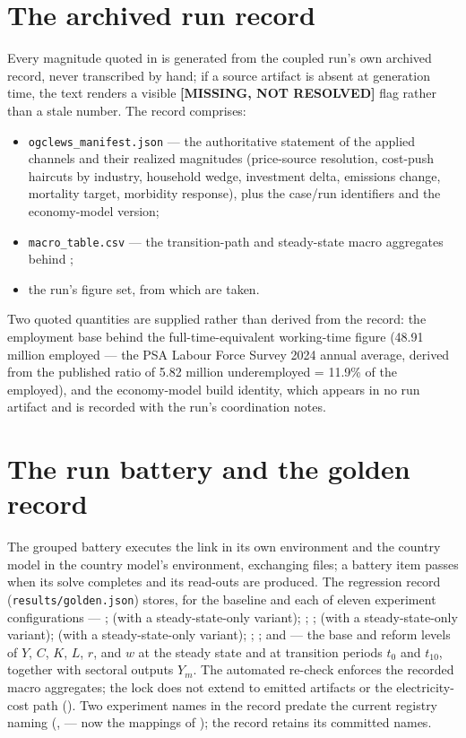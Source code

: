 \section{The archived run record}
\label{app:run-record}
Every magnitude quoted in  is generated from the coupled run's own
archived record, never transcribed by hand; if a source artifact is absent at
generation time, the text renders a visible \textbf{[MISSING, NOT RESOLVED]} flag
rather than a stale number. The record comprises:
\begin{itemize}
\item \texttt{ogclews\_manifest.json} --- the authoritative statement of the applied
  channels and their realized magnitudes (price-source resolution, cost-push haircuts
  by industry, household wedge, investment delta, emissions change, mortality target,
  morbidity response), plus the \CLEWS{} case/run identifiers and the economy-model
  version;
\item \texttt{macro\_table.csv} --- the transition-path and steady-state macro
  aggregates behind ;
\item the run's figure set, from which  are taken.
\end{itemize}
Two quoted quantities are supplied rather than derived from the record: the employment
base behind the full-time-equivalent working-time figure (48.91 million employed ---
the PSA Labour Force Survey 2024 annual average, derived from the published ratio of
5.82 million underemployed = 11.9\% of the employed), and the economy-model build
identity, which appears in no run artifact and is recorded with the run's coordination
notes.

\section{The run battery and the golden record}
\label{app:battery}
The grouped battery executes the link in its own environment and the country
\OGCore{} model in the country model's environment, exchanging files; a battery item
passes when its solve completes and its read-outs are produced. The regression record
(\texttt{results/golden.json}) stores, for the baseline and each of
eleven experiment configurations ---
;  (with a steady-state-only variant);
; ;  (with a steady-state-only
variant);  (with a steady-state-only variant);
; ; and  ---
the base and reform levels of $Y$, $C$, $K$, $L$, $r$, and $w$ at the steady state
and at transition periods $t_0$ and $t_{10}$, together with sectoral outputs $Y_m$.
The automated re-check enforces the recorded macro aggregates; the lock does not
extend to emitted artifacts or the electricity-cost path
(). Two experiment names in the record predate the current
registry naming (,  --- now the 
mappings of ); the record retains its
committed names.
